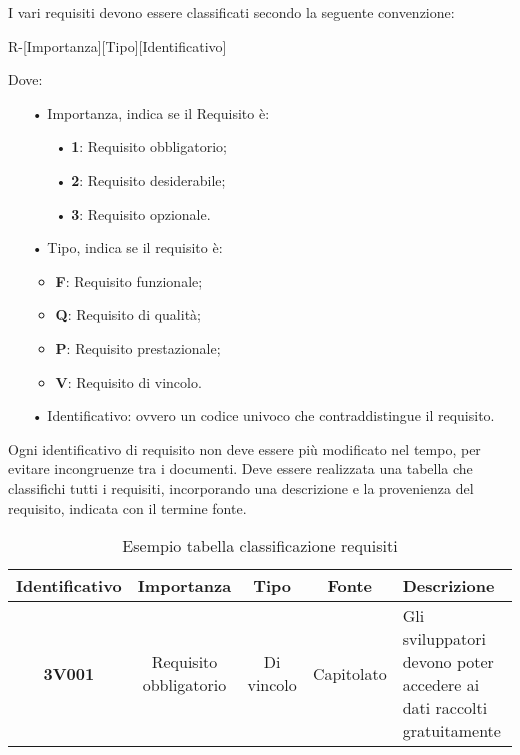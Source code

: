 I vari requisiti devono essere classificati secondo la seguente {convenzione}:
\begin{center}
R-[Importanza][Tipo][Identificativo]
\end{center}
Dove:
\begin{itemize}
\item[•] Importanza, indica se il Requisito è:
\begin{itemize}
\item[•] \textbf{1}: Requisito obbligatorio;
\item[•] \textbf{2}: Requisito desiderabile;
\item[•] \textbf{3}: Requisito opzionale.
\end{itemize}
\item[•] Tipo, indica se il requisito è:
\begin{itemize}
\item \textbf{F}: Requisito funzionale;
\item \textbf{Q}: Requisito di qualità;
\item \textbf{P}: Requisito prestazionale;
\item \textbf{V}: Requisito di vincolo.
\end{itemize}
\item[•] Identificativo: ovvero un codice univoco che contraddistingue il requisito.
\end{itemize}
Ogni identificativo di requisito non deve essere più modificato nel tempo, per evitare incongruenze tra i documenti.
Deve essere realizzata una tabella che classifichi tutti i requisiti, incorporando una descrizione e la provenienza del requisito, indicata con il termine fonte.
\begin{table}[H]
\centering
\begin{tabularx}{\linewidth}{| c | c | c | c | Z |}
\hline
\textbf{Identificativo} & \textbf{Importanza} & \textbf{Tipo} & \textbf{Fonte} & \textbf{Descrizione} \\
\hline
\textbf{3V001} & Requisito obbligatorio & Di vincolo & Capitolato & Gli sviluppatori devono poter accedere ai dati raccolti gratuitamente \\
\hline
\end{tabularx}
\caption{Esempio tabella classificazione requisiti}
\end{table}
